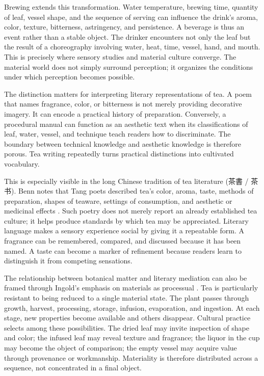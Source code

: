 \documentclass[numbers]{IntechOpen-Book}
\newcommand{\zh}[1]{{\CJKfontspec{Noto Serif CJK SC}\upshape #1}}
\begin{document}
Brewing extends this transformation. Water temperature, brewing time, quantity of leaf, vessel shape, and the sequence of serving can influence the drink's aroma, color, texture, bitterness, astringency, and persistence. A beverage is thus an event rather than a stable object. The drinker encounters not only the leaf but the result of a choreography involving water, heat, time, vessel, hand, and mouth. This is precisely where sensory studies and material culture converge. The material world does not simply surround perception; it organizes the conditions under which perception becomes possible.

The distinction matters for interpreting literary representations of tea. A poem that names fragrance, color, or bitterness is not merely providing decorative imagery. It can encode a practical history of preparation. Conversely, a procedural manual can function as an aesthetic text when its classifications of leaf, water, vessel, and technique teach readers how to discriminate. The boundary between technical knowledge and aesthetic knowledge is therefore porous. Tea writing repeatedly turns practical distinctions into cultivated vocabulary.

This is especially visible in the long Chinese tradition of tea literature (\zh{茶書 / 茶书}). Benn notes that Tang poets described tea's color, aroma, taste, methods of preparation, shapes of teaware, settings of consumption, and aesthetic or medicinal effects \cite{bennpoetry}. Such poetry does not merely report an already established tea culture; it helps produce standards by which tea may be appreciated. Literary language makes a sensory experience social by giving it a repeatable form. A fragrance can be remembered, compared, and discussed because it has been named. A taste can become a marker of refinement because readers learn to distinguish it from competing sensations.

The relationship between botanical matter and literary mediation can also be framed through Ingold's emphasis on materials as processual \cite{ingoldmaterials}. Tea is particularly resistant to being reduced to a single material state. The plant passes through growth, harvest, processing, storage, infusion, evaporation, and ingestion. At each stage, new properties become available and others disappear. Cultural practice selects among these possibilities. The dried leaf may invite inspection of shape and color; the infused leaf may reveal texture and fragrance; the liquor in the cup may become the object of comparison; the empty vessel may acquire value through provenance or workmanship. Materiality is therefore distributed across a sequence, not concentrated in a final object.
\end{document}
